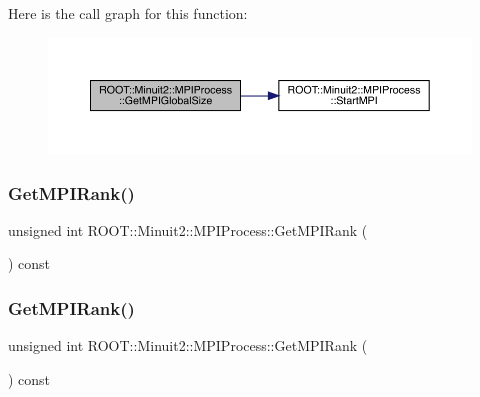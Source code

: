 Here is the call graph for this function\+:
\nopagebreak
\begin{figure}[H]
\begin{center}
\leavevmode
\includegraphics[width=350pt]{dc/d43/classROOT_1_1Minuit2_1_1MPIProcess_acfa3106122ad8f8c7d6bb3777c3d1ccc_cgraph}
\end{center}
\end{figure}
\mbox{\label{classROOT_1_1Minuit2_1_1MPIProcess_a86c50a55e3ae2651b74fa18443a13dd3}} 
\subsubsection{\texorpdfstring{GetMPIRank()}{GetMPIRank()}\hspace{0.1cm}{\footnotesize\ttfamily [1/3]}}
{\footnotesize\ttfamily unsigned int R\+O\+O\+T\+::\+Minuit2\+::\+M\+P\+I\+Process\+::\+Get\+M\+P\+I\+Rank (\begin{DoxyParamCaption}{ }\end{DoxyParamCaption}) const\hspace{0.3cm}{\ttfamily [inline]}}

\mbox{\label{classROOT_1_1Minuit2_1_1MPIProcess_a86c50a55e3ae2651b74fa18443a13dd3}} 
\subsubsection{\texorpdfstring{GetMPIRank()}{GetMPIRank()}\hspace{0.1cm}{\footnotesize\ttfamily [2/3]}}
{\footnotesize\ttfamily unsigned int R\+O\+O\+T\+::\+Minuit2\+::\+M\+P\+I\+Process\+::\+Get\+M\+P\+I\+Rank (\begin{DoxyParamCaption}{ }\end{DoxyParamCaption}) const\hspace{0.3cm}{\ttfamily [inline]}}

